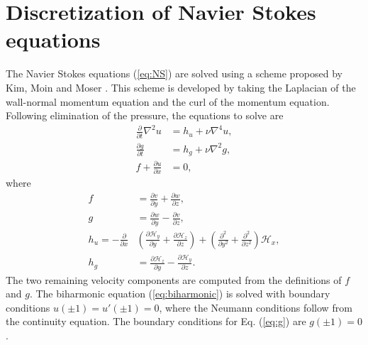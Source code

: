 \documentclass[preprint]{elsarticle}
\begin{document}
\section{Discretization of Navier Stokes equations}
\label{sec:discretizationNS}
The Navier Stokes equations (\ref{eq:NS}) are solved using a scheme 
proposed by Kim, Moin and Moser \cite{Kim87}. This scheme is developed by taking the 
Laplacian of the wall-normal momentum equation and the curl of the momentum 
equation. Following elimination of the pressure, the equations to solve are 
\begin{align}
\frac{\partial}{\partial t} \nabla^2 u &= h_u + \nu \nabla^4 u, 
\label{eq:biharmonic} \\
\frac{\partial g}{\partial t} &= h_g + \nu \nabla^2 g, \label{eq:g} \\
f + \frac{\partial u}{\partial x} &= 0, \label{eq:f}
\end{align}
where
\begin{align}
f &= \frac{\partial v}{\partial y} + \frac{\partial w}{\partial z}, \\
g &= \frac{\partial w}{\partial y} - \frac{\partial v}{\partial z}, \\
h_u = -\frac{\partial}{\partial x} &\left( \frac{\partial 
\mathcal{H}_y}{\partial y} + \frac{\partial \mathcal{H}_z}{\partial z} \right) 
+ \left(\frac{\partial^2}{\partial y^2} + \frac{\partial^2}{\partial z^2} 
\right) \mathcal{H}_x ,
\\
h_g &= \frac{\partial \mathcal{H}_z}{\partial y} - \frac{\partial 
\mathcal{H}_y}{\partial z}.
\end{align}
The two remaining velocity components are computed from the definitions of $f$ 
and $g$. The biharmonic equation (\ref{eq:biharmonic}) is solved with boundary 
conditions $u(\pm 1) = u'(\pm 1) = 0$, where the Neumann conditions follow 
from the continuity equation. The boundary conditions for Eq. (\ref{eq:g}) are 
$g(\pm 1) = 0$. 
\end{document}
